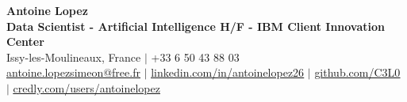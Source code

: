\documentclass[letterpaper,10pt]{article}
\begin{document}
\begin{center}
    {\Huge \textbf{Antoine Lopez}} \\ \vspace{2pt}
    {\large \textbf{Data Scientist - Artificial Intelligence H/F - IBM Client Innovation Center}} \\ \vspace{3pt}
    \small
    Issy-les-Moulineaux, France $|$ +33 6 50 43 88 03 \\
    \href{mailto:antoine.lopezsimeon@free.fr}{\underline{antoine.lopezsimeon@free.fr}} $|$ 
    \href{https://linkedin.com/in/antoinelopez26}{\underline{linkedin.com/in/antoinelopez26}} $|$
    \href{https://github.com/C3L0}{\underline{github.com/C3L0}} $|$
    \href{https://www.credly.com/users/antoinelopez26}{\underline{credly.com/users/antoinelopez}}
\end{center}

\vspace{-10pt}







\end{document}
